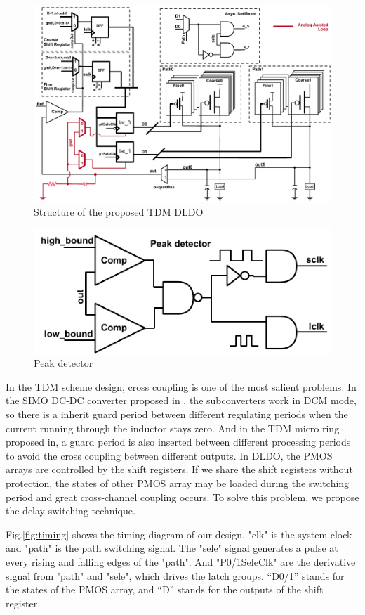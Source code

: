 \documentclass[journal]{IEEEtran}
\begin{document}
\begin{figure}[t!]
    \centering
    \includegraphics{pic/struc/sche.pdf}
    \caption{Structure of the proposed TDM DLDO}
    \label{fig:diag}
\end{figure}
\begin{figure}[t!]
    \centering
    \includegraphics[width=0.7\linewidth]{pic/struc/peak.pdf}
    \caption{Peak detector}
    \label{fig:peak}
\end{figure}
In the TDM scheme design, cross coupling is one of the most salient problems. In the SIMO DC-DC converter proposed in \cite{SIMODCDC}, the subconverters work in DCM mode, so there is a inherit guard period  between different regulating periods when the current running through the inductor stays zero. And in the TDM micro ring proposed in\cite{wangzhicheng}, a guard period is also inserted between different processing periods to avoid the cross coupling between different outputs. In DLDO, the PMOS arrays are controlled by the shift registers. If we share the shift registers without protection, the states of other PMOS array may be loaded during the switching period and great cross-channel coupling occurs. To solve this problem, we propose the delay switching technique.

Fig.\ref{fig:timing} shows the timing diagram of our design, "clk" is the system clock and "path" is the path switching signal. The "sele" signal generates a pulse at every rising and falling edges of the "path". And "P0/1SeleClk" are the derivative signal from "path" and "sele", which drives the latch groups. “D0/1” stands for the states of the PMOS array, and “D” stands for the outputs of the shift register. 
\end{document}
